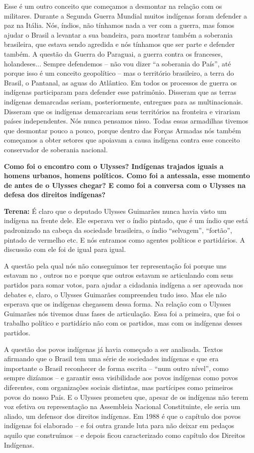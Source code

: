 Esse é um outro conceito que começamos a desmontar na relação com os
militares. Durante a Segunda Guerra Mundial muitos indígenas foram
defender a paz na Itália. Nós, índios, não tínhamos nada a ver com a
guerra, mas fomos ajudar o Brasil a levantar a sua bandeira, para
mostrar também a soberania brasileira, que estava sendo agredida e nós
tínhamos que ser parte e defender também. A questão da Guerra do
Paraguai, a guerra contra os franceses, holandeses... Sempre defendemos
-- não vou dizer ``a soberania do País'', até porque isso é um conceito
geopolítico -- mas o território brasileiro, a terra do Brasil, o
Pantanal, as aguas do Atlântico. Em todos os processos de guerra os
indígenas participaram para defender esse patrimônio. Disseram que as
terras indígenas demarcadas seriam, posteriormente, entregues para as
multinacionais. Disseram que os indígenas demarcariam seus territórios
na fronteira e virariam países independentes. Nós nunca pensamos nisso.
Todas essas armadilhas tivemos que desmontar pouco a pouco, porque
dentro das Forças Armadas nós também começamos a obter setores que
apoiavam a causa indígena contra esse conceito conservador de soberania
nacional.

\textbf{Como foi o encontro com o Ulysses? Indígenas trajados iguais a
homens urbanos, homens políticos. Como foi a antessala, esse momento de
antes de o Ulysses chegar? E como foi a conversa com o Ulysses na defesa
dos direitos indígenas?}

\textbf{Terena:} É claro que o deputado Ulysses Guimarães nunca havia
visto um indígena na frente dele. Ele esperava ver o índio pintado, que
é um índio que está padronizado na cabeça da sociedade brasileira, o
índio ``selvagem'', ``fortão'', pintado de vermelho etc. E nós entramos
como agentes políticos e partidários. A discussão com ele foi de igual
para igual.

A questão pela qual nós não conseguimos ter representação foi porque uns
estavam no , outros no  e porque que outros estavam se articulando
com seus partidos para somar votos, para ajudar a cidadania indígena a
ser aprovada nos debates e, claro, o Ulysses Guimarães compreendeu tudo
isso. Mas ele não esperava que os indígenas chegassem dessa forma. Na
relação com o Ulysses Guimarães nós tivemos duas fases de articulação.
Essa foi a primeira, que foi o trabalho político e partidário não com os
partidos, mas com os indígenas desses partidos.

A questão dos povos indígenas já havia começado a ser analisada. Textos
afirmando que o Brasil tem uma série de sociedades indígenas e que era
importante o Brasil reconhecer de forma escrita -- ``num outro nível'',
como sempre dizíamos -- e garantir essa visibilidade aos povos indígenas
como povos diferentes, com organizações sociais distintas, mas
partícipes como primeiros povos do nosso País. E o Ulysses prometeu que,
apesar de os indígenas não terem voz efetiva ou representação na
Assembleia Nacional Constituinte, ele seria um aliado, um defensor dos
direitos indígenas. Em 1988 é que o capítulo dos povos indígenas foi
elaborado -- e foi outra grande luta para não deixar em pedaços aquilo
que construímos -- e depois ficou caracterizado como capítulo dos
Direitos Indígenas.

